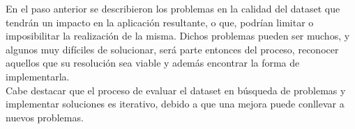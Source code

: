 En el paso anterior se describieron los problemas en la calidad del dataset que tendrán un impacto en la aplicación resultante, 
o que, podrían limitar o imposibilitar la realización de la misma. Dichos problemas pueden ser muchos, y algunos muy difíciles
de solucionar, será parte entonces del proceso, reconocer aquellos que su resolución sea viable y además encontrar la forma de 
implementarla.\\
Cabe destacar que el proceso de evaluar el dataset en búsqueda de problemas y implementar soluciones es iterativo, debido a que 
una mejora puede conllevar a nuevos problemas.\\
